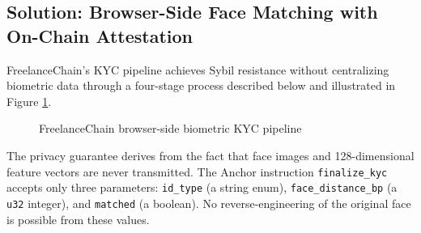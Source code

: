\subsection{Solution: Browser-Side Face Matching with On-Chain Attestation}

FreelanceChain's KYC pipeline achieves Sybil resistance without centralizing biometric data through a four-stage process described below and illustrated in Figure \ref{fig:kyc_pipeline}.

\begin{figure}[H]
    \centering
    \caption{FreelanceChain browser-side biometric KYC pipeline}
    \label{fig:kyc_pipeline}
\end{figure}

The privacy guarantee derives from the fact that face images and 128-dimensional feature vectors are never transmitted. The Anchor instruction \texttt{finalize\_kyc} accepts only three parameters: \texttt{id\_type} (a string enum), \texttt{face\_distance\_bp} (a \texttt{u32} integer), and \texttt{matched} (a boolean). No reverse-engineering of the original face is possible from these values.


